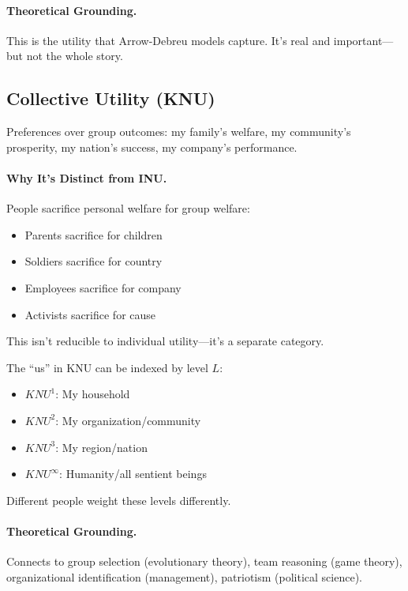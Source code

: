 \paragraph{Theoretical Grounding.}
This is the utility that Arrow-Debreu models capture.
It's real and important---but not the whole story.

\subsection{Collective Utility (KNU)}
\label{sec:fepsde-knu}

\begin{definition}
Preferences over group outcomes: my family's welfare, my community's prosperity,
my nation's success, my company's performance.
\end{definition}

\paragraph{Why It's Distinct from INU.}
People sacrifice personal welfare for group welfare:
\begin{itemize}[nosep]
  \item Parents sacrifice for children
  \item Soldiers sacrifice for country
  \item Employees sacrifice for company
  \item Activists sacrifice for cause
\end{itemize}

This isn't reducible to individual utility---it's a separate category.

\begin{intuition}
The ``us'' in KNU can be indexed by level $L$:
\begin{itemize}[nosep]
  \item $KNU^1$: My household
  \item $KNU^2$: My organization/community
  \item $KNU^3$: My region/nation
  \item $KNU^\infty$: Humanity/all sentient beings
\end{itemize}
Different people weight these levels differently.
\end{intuition}

\paragraph{Theoretical Grounding.}
Connects to group selection (evolutionary theory), team reasoning (game theory),
organizational identification (management), patriotism (political science).

